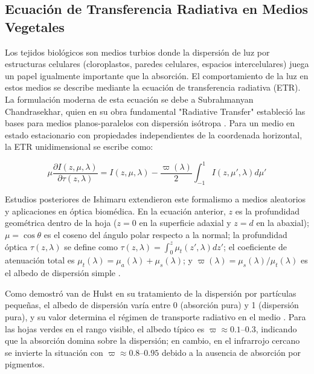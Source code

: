 \documentclass[12pt, a4paper]{article}
\begin{document}
	\subsection{Ecuación de Transferencia Radiativa en Medios Vegetales}
	
	Los tejidos biológicos son medios turbios donde la dispersión de luz por estructuras celulares (cloroplastos, paredes celulares, espacios intercelulares) juega un papel igualmente importante que la absorción. El comportamiento de la luz en estos medios se describe mediante la ecuación de transferencia radiativa (ETR). La formulación moderna de esta ecuación se debe a Subrahmanyan Chandrasekhar, quien en su obra fundamental "Radiative Transfer" estableció las bases para medios planos-paralelos con dispersión isótropa \parencite{Chandrasekhar1960}. Para un medio en estado estacionario con propiedades independientes de la coordenada horizontal, la ETR unidimensional se escribe como:
	
	\begin{equation}
		\mu \frac{\partial I(z, \mu, \lambda)}{\partial \tau(z, \lambda)} = I(z, \mu, \lambda) - \frac{\varpi(\lambda)}{2} \int_{-1}^{1} I(z, \mu', \lambda) d\mu'
		\label{eq:etr_estacionaria}
	\end{equation}
	
	Estudios posteriores de Ishimaru extendieron este formalismo a medios aleatorios y aplicaciones en óptica biomédica. En la ecuación anterior, $z$ es la profundidad geométrica dentro de la hoja ($z=0$ en la superficie adaxial y $z=d$ en la abaxial); $\mu = \cos\theta$ es el coseno del ángulo polar respecto a la normal; la profundidad óptica $\tau(z, \lambda)$ se define como $\tau(z, \lambda) = \int_{0}^{z} \mu_t(z', \lambda) dz'$; el coeficiente de atenuación total es $\mu_t(\lambda) = \mu_a(\lambda) + \mu_s(\lambda)$; y $\varpi(\lambda) = \mu_s(\lambda) / \mu_t(\lambda)$ es el albedo de dispersión simple \parencite{Ishimaru1978}.
	
	Como demostró van de Hulst en su tratamiento de la dispersión por partículas pequeñas, el albedo de dispersión varía entre 0 (absorción pura) y 1 (dispersión pura), y su valor determina el régimen de transporte radiativo en el medio \parencite{vandeHulst1981}. Para las hojas verdes en el rango visible, el albedo típico es $\varpi \approx 0.1$--$0.3$, indicando que la absorción domina sobre la dispersión; en cambio, en el infrarrojo cercano se invierte la situación con $\varpi \approx 0.8$--$0.95$ debido a la ausencia de absorción por pigmentos.
	
\end{document}
